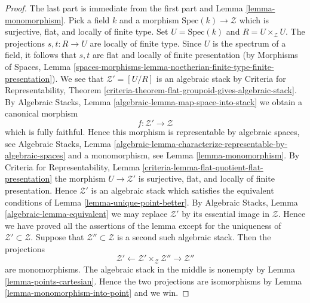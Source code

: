\begin{proof}
The last part is immediate from the first part and
Lemma \ref{lemma-monomorphism}.
Pick a field $k$ and a morphism $\text{Spec}(k) \to \mathcal{Z}$
which is surjective, flat, and locally of finite type.
Set $U = \text{Spec}(k)$ and $R = U \times_\mathcal{Z} U$.
The projections $s, t : R \to U$ are locally of finite type.
Since $U$ is the spectrum of a field, it follows that
$s, t$ are flat and locally of finite presentation (by
Morphisms of Spaces, Lemma
\ref{spaces-morphisms-lemma-noetherian-finite-type-finite-presentation}).
We see that $\mathcal{Z}' = [U/R]$ is an algebraic stack by
Criteria for Representability,
Theorem \ref{criteria-theorem-flat-groupoid-gives-algebraic-stack}.
By
Algebraic Stacks, Lemma \ref{algebraic-lemma-map-space-into-stack}
we obtain a canonical morphism
$$
f : \mathcal{Z}' \longrightarrow \mathcal{Z}
$$
which is fully faithful. Hence this morphism is representable by
algebraic spaces, see
Algebraic Stacks, Lemma
\ref{algebraic-lemma-characterize-representable-by-algebraic-spaces}
and a monomorphism, see
Lemma \ref{lemma-monomorphism}.
By
Criteria for Representability,
Lemma \ref{criteria-lemma-flat-quotient-flat-presentation}
the morphism $U \to \mathcal{Z}'$ is surjective, flat, and locally of finite
presentation. Hence $\mathcal{Z}'$ is an algebraic stack which satisfies
the equivalent conditions of
Lemma \ref{lemma-unique-point-better}.
By
Algebraic Stacks, Lemma \ref{algebraic-lemma-equivalent}
we may replace $\mathcal{Z}'$ by its essential image in $\mathcal{Z}$.
Hence we have proved all the assertions of the lemma except for the
uniqueness of $\mathcal{Z}' \subset \mathcal{Z}$. Suppose that
$\mathcal{Z}'' \subset \mathcal{Z}$ is a second such algebraic stack.
Then the projections
$$
\mathcal{Z}'
\longleftarrow
\mathcal{Z}' \times_\mathcal{Z} \mathcal{Z}''
\longrightarrow
\mathcal{Z}''
$$
are monomorphisms. The algebraic stack in the middle is nonempty by
Lemma \ref{lemma-points-cartesian}.
Hence the two projections are isomorphisms by
Lemma \ref{lemma-monomorphism-into-point}
and we win.
\end{proof}

